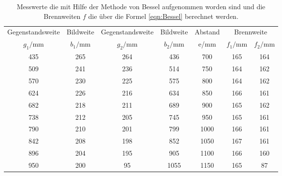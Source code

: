   \begin{table}
    \centering
    \caption{Messwerte die mit Hilfe der Methode von Bessel aufgenommen worden sind
    und die Brennweiten $f$ die über die Formel \eqref{eqn:Bessel} berechnet werden.}
    \label{tab:bessel}
    \begin{tabular}{c c c c c c c}
    \toprule
    Gegenstandsweite   & Bildweite &  Gegenstandsweite   & Bildweite & Abstand  & \multicolumn{2}{c}{Brennweite}\\
    $g_1/\si{\milli\meter}$ & $b_1/\si{\milli\meter}$ &$g_2/\si{\milli\meter}$ & $b_2/\si{\milli\meter}$ & e/\si{\milli\meter} & $f_1/\si{\milli\meter}$ & $f_2/\si{\milli\meter}$\\
    \midrule
  435  &   265 &   264 &   436  & 700  & 165 & 164 \\
  509  &   241 &   236 &   514  & 750  & 164 & 162 \\
  570  &   230 &   225 &   575  & 800  & 164 & 162 \\
  624  &   226 &   216 &   634  & 850  & 166 & 161 \\
  682  &   218 &   211 &   689  & 900  & 165 & 162 \\
  738  &   212 &   205 &   745  & 950  & 165 & 161 \\
  790  &   210 &   201 &   799  & 1000 & 166 & 161 \\
  842  &   208 &   198 &   852  & 1050 & 167 & 161 \\
  896  &   204 &   195 &   905  & 1100 & 166 & 160 \\
  950  &   200 &    95 &   1055 & 1150 & 165 & 87  \\
  \bottomrule
\end{tabular}
\end{table}
